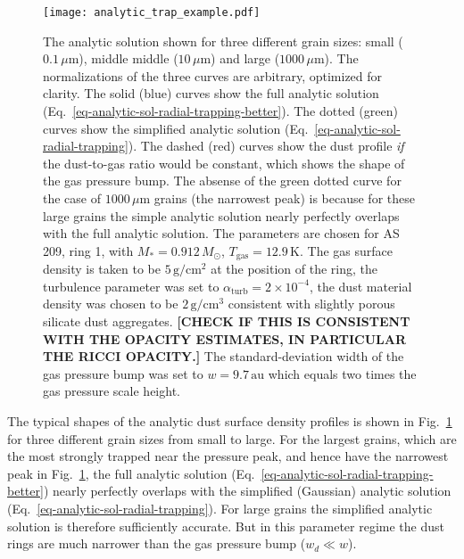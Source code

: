 \documentclass{aa}
\begin{document}
\begin{figure}
\centerline{\texttt{[image: analytic\_trap\_example.pdf]}}
\caption{\label{fig-analytic-model-example}The analytic solution shown for three
  different grain sizes: small ($0.1\,\mu\mathrm{m}$), middle middle
  ($10\,\mu\mathrm{m}$) and large ($1000\,\mu\mathrm{m}$). The normalizations of
  the three curves are arbitrary, optimized for clarity. The solid (blue) curves
  show the full analytic solution
  (Eq.~\ref{eq-analytic-sol-radial-trapping-better}).  The dotted (green) curves
  show the simplified analytic solution
  (Eq.~\ref{eq-analytic-sol-radial-trapping}). The dashed (red) curves show the
  dust profile {\em if} the dust-to-gas ratio would be constant, which shows the
  shape of the gas pressure bump. The absense of the green dotted curve for the
  case of $1000\,\mu\mathrm{m}$ grains (the narrowest peak) is because for these
  large grains the simple analytic solution nearly perfectly overlaps with the
  full analytic solution. The parameters are chosen for AS 209, ring 1,
  with $M_{*}=0.912\,M_{\odot}$, $T_{\mathrm{gas}}=12.9\,\mathrm{K}$. The gas
  surface density is taken to be $5\,\mathrm{g}/\mathrm{cm}^2$ at the position
  of the ring, the turbulence parameter was set to
  $\alpha_{\mathrm{turb}}=2\times 10^{-4}$, the dust material density was chosen
  to be $2\,\mathrm{g}/\mathrm{cm}^3$ consistent with slightly porous silicate
  dust aggregates.
  {\bf [CHECK IF THIS IS CONSISTENT WITH THE OPACITY ESTIMATES, IN PARTICULAR
  THE RICCI OPACITY.]}
  The standard-deviation width of the gas pressure bump was set
  to $w=9.7\,\mathrm{au}$ which equals two times the gas pressure scale height.}
\end{figure}

The typical shapes of the analytic dust surface density profiles is shown in
Fig.~\ref{fig-analytic-model-example} for three different grain sizes from small
to large. For the largest grains, which are the most strongly trapped near the
pressure peak, and hence have the narrowest peak in
Fig.~\ref{fig-analytic-model-example}, the full analytic solution
(Eq.~\ref{eq-analytic-sol-radial-trapping-better}) nearly perfectly overlaps
with the simplified (Gaussian) analytic solution
(Eq.~\ref{eq-analytic-sol-radial-trapping}). For large grains the simplified
analytic solution is therefore sufficiently accurate. But in this parameter
regime the dust rings are much narrower than the gas pressure bump ($w_d\ll w$).
\end{document}

